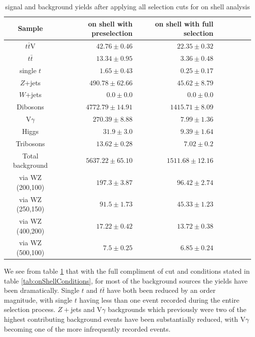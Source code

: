 \begin{table}[H]
\begin{center}
\begin{tabular}{c r r r r r r r}
\toprule
Sample& on shell with preselection & on shell with full selection\\

\midrule
$t\bar{t}$V&  $ 42.76 \pm 0.46 $& $ 22.35 \pm 0.32 $\\

$t\bar{t}$&  	 $13.34\pm 0.95$& 	 $3.36\pm 0.48$\\

single $t$&  	 $1.65\pm 0.43$& 	 $0.25\pm 0.17$\\

$Z$+jets& 	 $490.78\pm 62.66$& 	$45.62\pm 8.79$\\

$W$+jets&  	 $0.0\pm 0.0$& 	 $0.0\pm 0.0$\\

Dibosons&  	 $4772.79\pm 14.91$& 	 $1415.71\pm 8.09$\\

V$\gamma$&  	 $270.39\pm 8.88$& 	 $7.99\pm 1.36$\\

Higgs& 	 $31.9\pm 3.0$& 	 $9.39\pm 1.64$\\

Tribosons&  	 $13.62\pm 0.28$& 	 $7.02\pm 0.2$\\

\hline
Total background&  	 $5637.22\pm65.10$& 	 $1511.68\pm12.16$\\

\hline\hline
via WZ (200,100)&  	 $197.3\pm 3.87$& 	 $96.42\pm 2.74$\\

via WZ (250,150)&  	 $91.5\pm 1.73$& 	 $45.33\pm 1.23$\\

via WZ (400,200)& 	 $17.22\pm 0.42$& 	 $13.72\pm 0.38$\\

via WZ (500,100)&	 $7.5\pm 0.25$& 	 $6.85\pm 0.24$\\

\bottomrule
\end{tabular}
\end{center}
\caption{signal and background yields after applying all selection cuts for on shell analysis}
\label{tab:onshellResults}
\end{table}

We see from table \ref{tab:onshellResults} that with the full compliment of cut and conditions stated in table \ref{tab:onShellConditions}, for most of the background sources the yields have been dramatically.
Single $t$ and $t\bar{t}$ have both been reduced by an order magnitude, with single $t$ having less than one event recorded during the entire selection process.
$Z+$jets and V$\gamma$ backgrounds which previously were two of the highest contributing background events have been substantially reduced, with V$\gamma$ becoming one of the more infrequently recorded events. 

